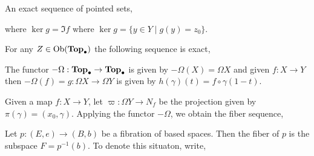 \documentclass[12pt]{extarticle}
\begin{document}
\begin{definition}
An exact sequence of pointed sets,
\begin{center}
\end{center} 
where $\ker{g} = \Im{f}$ where $\ker{g} = \{y \in Y \mid g(y) = z_0\}$.
\end{definition}

\begin{theorem}
For any $Z \in \mathrm{Ob}(\mathbf{Top}_{\bullet})$ the following sequence is exact,
\begin{center}
\end{center}  
\end{theorem}

\begin{definition}
The functor $-\Omega : \mathbf{Top}_{\bullet} \to \mathbf{Top}_{\bullet}$ is given by $-\Omega (X) = \Omega X$ and given $f : X \to Y$ then $- \Omega (f) = g : \Omega X \to \Omega Y$ is given by $h(\gamma)(t) = f \circ \gamma(1 - t)$.  
\end{definition}

\begin{definition}
Given a map $f : X \to Y$, let $\varpi : \Omega Y \to N_f$ be the projection given by $\pi(\gamma) = (x_0, \gamma)$. Applying the functor $-\Omega$, we obtain the fiber sequence,
\begin{center}
\end{center} 
\end{definition}

\begin{definition}
Let $p : (E, e) \to (B, b)$ be a fibration of based spaces. Then the fiber of $p$ is the subspace $F = p^{-1}(b)$. To denote this situaton, write,
\begin{center}
\end{center}
\end{definition}
\end{document}
